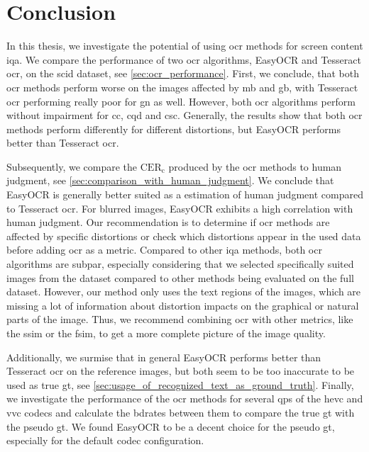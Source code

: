 \chapter{Conclusion}
\label{chap:conclusion}

In this thesis, we investigate the potential of using \gls{ocr} methods for screen content \gls{iqa}.
We compare the performance of two \gls{ocr} algorithms, EasyOCR and Tesseract \gls{ocr}, on the \gls{scid} dataset, see \autoref{sec:ocr_performance}.
First, we conclude, that both \gls{ocr} methods perform worse on the images affected by \gls{mb} and \gls{gb}, with Tesseract \gls{ocr} performing really poor for \gls{gn} as well.
However, both \gls{ocr} algorithms perform without impairment for \gls{cc}, \gls{cqd} and \gls{csc}.
Generally, the results show that both \gls{ocr} methods perform differently for different distortions, but EasyOCR performs better than Tesseract \gls{ocr}.


Subsequently, we compare the $\text{CER}_{\text{c}}$ produced by the \gls{ocr} methods to human judgment, see \autoref{sec:comparison_with_human_judgment}.
We conclude that EasyOCR is generally better suited as a estimation of human judgment compared to Tesseract \gls{ocr}.
For blurred images, EasyOCR exhibits a high correlation with human judgment.
Our recommendation is to determine if \gls{ocr} methods are affected by specific distortions or check which distortions appear in the used data before adding \gls{ocr} as a metric.
Compared to other \gls{iqa} methods, both \gls{ocr} algorithms are subpar, especially considering that we selected specifically suited images from the dataset compared to other methods being evaluated on the full dataset.
However, our method only uses the text regions of the images, which are missing a lot of information about distortion impacts on the graphical or natural parts of the image.
Thus, we recommend combining \gls{ocr} with other metrics, like the \gls{ssim} or the \gls{fsim}, to get a more complete picture of the image quality.

Additionally, we surmise that in general EasyOCR performs better than Tesseract \gls{ocr} on the reference images, but both seem to be too inaccurate to be used as true \gls{gt}, see \autoref{sec:usage_of_recognized_text_as_ground_truth}.
Finally, we investigate the performance of the \gls{ocr} methods for several \glspl{qp} of the \gls{hevc} and \gls{vvc} codecs and calculate the \glspl{bdrate} between them to compare the true \gls{gt} with the pseudo \gls{gt}.
We found EasyOCR to be a decent choice for the pseudo \gls{gt}, especially for the default codec configuration.

